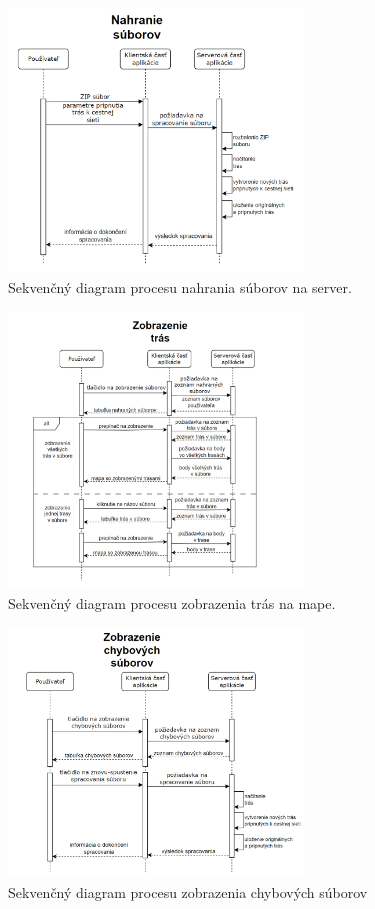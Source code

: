 \begin{figure}[H]
    \centering
    \includegraphics[width=0.7\textwidth]{img/diagramy/sekvencny-nahranie.png}
    \caption{Sekvenčný diagram procesu nahrania súborov na server.}
    \label{fig:seq-upload-zip}
\end{figure}
\begin{figure}[H]
    \centering
    \includegraphics[width=0.7\textwidth]{img/diagramy/sekvencny-trasy.png}
    \caption{Sekvenčný diagram procesu zobrazenia trás na mape.}
    \label{fig:seq-show-routes}
\end{figure}
\begin{figure}[H]
    \centering
    \includegraphics[width=0.7\textwidth]{img/diagramy/sekvencny-chybove.png}
    \caption{Sekvenčný diagram procesu zobrazenia chybových súborov}
    \label{fig:seq-show-errors}
\end{figure}




